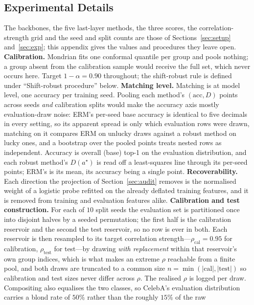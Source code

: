 \documentclass[pdflatex,sn-basic]{sn-jnl}%
\theoremstyle{thmstyleone}%
\newcommand{\rhocal}{\rho_{\mathrm{cal}}}
\newcommand{\rhotest}{\rho_{\mathrm{test}}}
\begin{document}
\begin{appendices}
\section{Experimental Details}
\label{app:hyper}
The backbones, the five last-layer methods, the three scores, the correlation-strength grid and
the seed and split counts are those of Sections~\ref{sec:setup} and~\ref{sec:exp}; this appendix
gives the values and procedures they leave open.
\textbf{Calibration.} Mondrian fits one conformal quantile per group and pools nothing; a group
absent from the calibration sample would receive the full set, which never occurs here. Target
$1-\alpha=0.90$ throughout; the shift-robust rule is defined under ``Shift-robust procedure'' below.
\textbf{Matching level.} Matching is at model level, one accuracy per training seed. Pooling each
method's $(\mathrm{acc},D)$ points across seeds \emph{and} calibration splits would make the accuracy
axis mostly evaluation-draw noise: ERM's per-seed base accuracy is identical to five decimals in
every setting, so its apparent spread is only which evaluation rows were drawn, matching on it
compares ERM on unlucky draws against a robust method on lucky ones, and a bootstrap over the pooled
points treats nested rows as independent. Accuracy is overall (base) top-1 on the evaluation
distribution, and each robust method's $D(a^\star)$ is read off a least-squares line through its per-seed
points; ERM's is its mean, its accuracy being a single point.
\textbf{Recoverability.} Each direction the projection of Section~\ref{sec:audit} removes is the
normalised weight of a logistic probe refitted on the already deflated training features, and it is
removed from training and evaluation features alike.
\textbf{Calibration and test construction.} For each of $10$ split seeds the
evaluation set is partitioned once into disjoint halves by a seeded permutation; the
first half is the calibration reservoir and the second the test reservoir, so no row is
ever in both. Each reservoir is then resampled to its target correlation
strength---$\rhocal=0.95$ for calibration, $\rhotest$ for test---by drawing \emph{with
replacement} within that reservoir's own group indices, which is what makes an extreme $\rho$
reachable from a finite pool, and both draws are truncated to a common size
$n=\min(|\mathrm{cal}|,|\mathrm{test}|)$ so calibration and test sizes never differ
across $\rho$. The realised $\rho$ is logged per draw. Compositing also equalises the two classes, so CelebA's
evaluation distribution carries a blond rate of $50\%$ rather than the roughly $15\%$ of the raw

\end{appendices}
\end{document}
